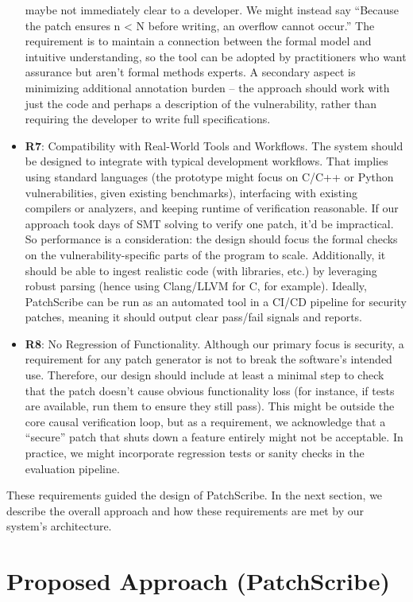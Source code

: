 \documentclass[conference,compsoc]{IEEEtran}
\begin{document}
\begin{itemize}
  maybe not immediately clear to a developer. We might instead say
  ``Because the patch ensures n \textless{} N before writing, an
  overflow cannot occur.'' The requirement is to maintain a connection
  between the formal model and intuitive understanding, so the tool can
  be adopted by practitioners who want assurance but aren't formal
  methods experts. A secondary aspect is minimizing additional
  annotation burden -- the approach should work with just the code and
  perhaps a description of the vulnerability, rather than requiring the
  developer to write full specifications.
\item
  \textbf{R7}: Compatibility with Real-World Tools and Workflows. The
  system should be designed to integrate with typical development
  workflows. That implies using standard languages (the prototype might
  focus on C/C++ or Python vulnerabilities, given existing benchmarks),
  interfacing with existing compilers or analyzers, and keeping runtime
  of verification reasonable. If our approach took days of SMT solving
  to verify one patch, it'd be impractical. So performance is a
  consideration: the design should focus the formal checks on the
  vulnerability-specific parts of the program to scale. Additionally, it
  should be able to ingest realistic code (with libraries, etc.) by
  leveraging robust parsing (hence using Clang/LLVM for C, for example).
  Ideally, PatchScribe can be run as an automated tool in a CI/CD
  pipeline for security patches, meaning it should output clear
  pass/fail signals and reports.
\item
  \textbf{R8}: No Regression of Functionality. Although our primary
  focus is security, a requirement for any patch generator is not to
  break the software's intended use. Therefore, our design should
  include at least a minimal step to check that the patch doesn't cause
  obvious functionality loss (for instance, if tests are available, run
  them to ensure they still pass). This might be outside the core causal
  verification loop, but as a requirement, we acknowledge that a
  ``secure'' patch that shuts down a feature entirely might not be
  acceptable. In practice, we might incorporate regression tests or
  sanity checks in the evaluation pipeline.
\end{itemize}

These requirements guided the design of PatchScribe. In the next
section, we describe the overall approach and how these requirements are
met by our system's architecture.

\section{Proposed Approach
(PatchScribe)}\label{proposed-approach-patchscribe}
\end{document}
